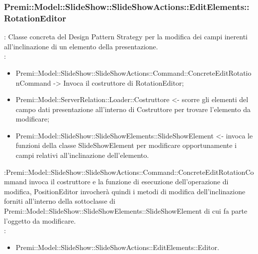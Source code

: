 {       \subsubsection{Premi::Model::SlideShow::SlideShowActions::EditElements::RotationEditor}{
				\textbf{\tipo}: Classe concreta del Design Pattern Strategy per la modifica dei campi inerenti all'inclinazione di un elemento della presentazione.\\	
				\textbf{\relaz}: 
				\begin{itemize}
					\item Premi::Model::SlideShow::SlideShowActions::Command::ConcreteEditRotationCommand -> Invoca il costruttore di RotationEditor;
                    \item Premi::Model::ServerRelation::Loader::Costruttore <- scorre gli elementi del campo dati presentazione all'interno di Costruttore per trovare l'elemento da modificare; 
                    \item Premi::Model::SlideShow::SlideShowElements::SlideShowElement <- invoca le funzioni della classe SlideShowElement per modificare opportunamente i campi relativi all'inclinazione dell’elemento.
				\end{itemize}	\textbf{\interfacce}:Premi::Model::SlideShow::SlideShowActions::Command::ConcreteEditRotationCommand invoca il costruttore e la funzione di esecuzione dell’operazione di modifica, PositionEditor invocherà quindi i metodi di modifica dell'inclinazione forniti all’interno della sottoclasse di Premi::Model::SlideShow::SlideShowElements::SlideShowElement di cui fa parte l’oggetto da modificare.\\
                \textbf{\base}: 
                    \begin{itemize}
                    \item Premi::Model::SlideShow::SlideShowActions::EditElements::Editor.
                    \end{itemize}
                    }
}
